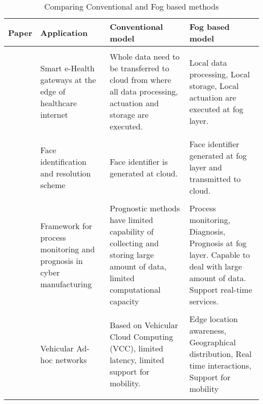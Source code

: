 \documentclass[10pt,a4paper,journal]{IEEEtran}
\begin{document}
\begin{center}
\begin{table}
	\centering
	\caption[Comparing Conventional and Fog based methods]{Comparing Conventional and Fog based methods}
\begin{tabular}{p{0.5cm}  p{2cm}  p{2.5cm}  p{2.5cm} }
\hline
\textbf{Paper} & \textbf{Application} & \textbf{Conventional model} & \textbf{Fog based model}\\
\hline
\\
  \cite{7}& Smart e-Health gateways at the edge of healthcare internet &  Whole data need to be transferred to cloud from where all data processing, actuation and storage are executed. 
&  Local data processing, Local storage, Local actuation are executed at fog layer. \\
\\
\cite{8} & Face identification and resolution scheme & Face identifier is generated at cloud. & Face identifier generated at fog layer and transmitted to cloud. \\
\\
\cite{9}& Framework for process monitoring and prognosis in cyber manufacturing  & Prognostic methods have limited capability  of collecting and storing large amount of data, limited computational capacity & Process monitoring, Diagnosis, Prognosis  at fog layer.  Capable to deal with large amount of data. Support real-time services.\\
\\
\cite{13}& Vehicular Ad-hoc networks & Based on Vehicular Cloud Computing (VCC), limited latency, limited support for mobility. & Edge location awareness, Geographical distribution, Real time interactions, Support for mobility\\
\\
\hline

\end{tabular}
\end{table}
\end{center}
		
\end{document}

